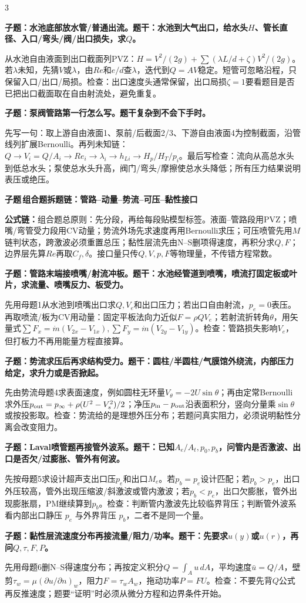\documentclass[a4paper]{article}
\newcommand{\qt}[1]{\vspace{0.04pt}\colorbox{Q}{\parbox{\dimexpr\linewidth-2\fboxsep}{\color{white}\bfseries #1}}\par}
\newcommand{\ans}[1]{\colorbox{G}{\parbox{\dimexpr\linewidth-2\fboxsep}{#1}}\par}
\newcommand{\form}[1]{{\color{M}\bfseries 公式链：}#1\par}
\newcommand{\labtag}[3]{{\bfseries\color{#1}\colorbox{#1}{\color{white}\fontsize{2.18}{2.28}\selectfont #2}\,#3}\par}
\newcommand{\subt}[1]{\labtag{Q}{子题}{#1}}
\begin{document}
\begin{multicols}{3}
\qt{子题：水池底部放水管/普通出流。题干：水池到大气出口，给水头$H$、管长直径、入口/弯头/阀/出口损失，求$Q$。}
\ans{从水池自由液面到出口截面列PVZ：$H=V^2/(2g)+\sum(\lambda L/d+\zeta)V^2/(2g)$。若$\lambda$未知，先猜$V$或$\lambda$，由$Re$和$e/d$查$\lambda$，迭代到$Q=AV$稳定。短管可忽略沿程，只保留入口/出口/局损。检查：出口速度头通常保留，出口局损$\zeta=1$要看题目是否已把出口截面取在自由射流处，避免重复。}
\qt{子题：泵阀管路第一行怎么写。题干复杂到不会下手时。}
\ans{先写一句：取上游自由液面1、泵前/后截面2/3、下游自由液面4为控制截面，沿管线列扩展Bernoulli。再列未知链：$Q\to V_i=Q/A_i\to Re_i\to\lambda_i\to h_{Li}\to H_p/H_T/p_i$。最后写检查：流向从高总水头到低总水头；泵使总水头升高，阀门/弯头/摩擦使总水头降低；所有压力结果说明表压或绝压。}
\subt{组合题拆题链：管路--动量--势流--可压--黏性接口}
\form{组合题总原则：先分段，再给每段贴模型标签。液面--管路段用PVZ；喷嘴/弯管受力段用CV动量；势流外场先求速度再用Bernoulli求压；可压喷管先用$M$链判状态，跨激波必须重置总压；黏性层流先由N--S删项得速度，再积分求$Q,F$；边界层先算$Re$再取$C_f,\delta$。接口量只传$Q,V,p,F$等物理量，不传错方程常数。}
\qt{子题：管路末端接喷嘴/射流冲板。题干：水池经管道到喷嘴，喷流打固定板或叶片，求流量、喷嘴反力、板受力。}
\ans{先用母题1从水池到喷嘴出口求$Q,V_e$和出口压力；若出口自由射流，$p_e=0$表压。再取喷流/板为CV用动量：固定平板法向力近似$F=\rho QV_e$；若射流折转角$\theta$，用矢量式$\sum F_x=\dot m(V_{2x}-V_{1x}),\sum F_y=\dot m(V_{2y}-V_{1y})$。检查：管路损失影响$V_e$，但打板力不再用能量方程直接算。}
\qt{子题：势流求压后再求结构受力。题干：圆柱/半圆柱/气膜馆外绕流，内部压力给定，求升力或是否掀起。}
\ans{先由势流母题4求表面速度，例如圆柱无环量$V_\theta=-2U\sin\theta$；再由定常Bernoulli求外压$p_{\rm out}=p_\infty+\rho(U^2-V_s^2)/2$；净压$p_{\rm in}-p_{\rm out}$沿表面积分，竖向分量乘$\sin\theta$或按投影取。检查：势流给的是理想外压分布；若题问真实阻力，必须说明黏性分离会改变阻力。}
\qt{子题：Laval喷管题再接管外波系。题干：已知$A_e/A_t,p_0,p_b$，问管内是否激波、出口是否欠/过膨胀、管外有何波。}
\ans{先按母题5求设计超声支出口压$p_e$和出口$M_e$。若$p_b=p_e$设计匹配；若$p_b>p_e$，出口外压较高，管外出现压缩波/斜激波或管内激波；若$p_b<p_e$，出口欠膨胀，管外出现膨胀扇，PM继续算到$p_b$。检查：判断管内激波先比较临界背压；判断管外波系看内部出口静压 $p_e$ 与外界背压 $p_b$，二者不是同一个量。}
\qt{子题：黏性层流速度分布再接流量/阻力/功率。题干：先要求$u(y)$或$u(r)$，再问$Q,\tau,F,P$。}
\ans{先用母题6删N--S得速度分布；再按定义积分$Q=\int_Au\,dA$，平均速度$\bar u=Q/A$，壁剪$\tau_w=\mu(\partial u/\partial n)_w$，阻力$F=\tau_wA_w$，拖动功率$P=FU$。检查：不要先背$Q$公式再反推速度；题要“证明”时必须从微分方程和边界条件开始。}

\end{multicols}
\end{document}
